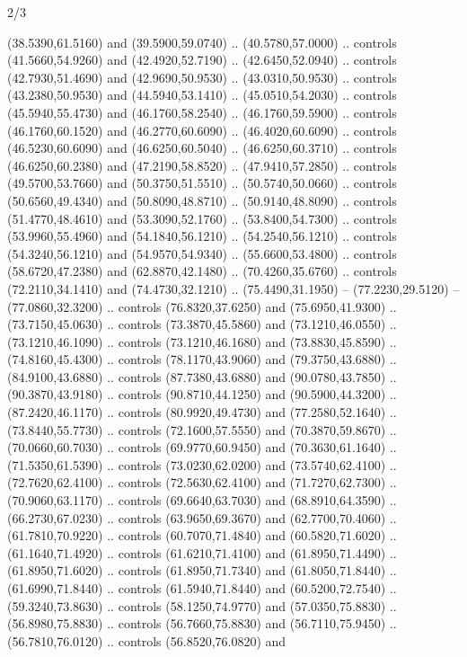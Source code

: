 \begin{flagdescription}{2/3}
\begin{scope}[xshift=0.5\flaglength,yshift=0.5\flagwidth,scale=\stretchfactor]
\begin{scope}[scale=0.001645\flagwidth,yshift=65mm,xshift=-63mm]
\begin{scope}[y=0.80pt, x=0.80pt, yscale=-1,]
\begin{scope}[cm={{1.33333,0.0,0.0,1.33333,(0.0,1e-05)}}]
  (38.5390,61.5160) and (39.5900,59.0740) .. (40.5780,57.0000) .. controls
  (41.5660,54.9260) and (42.4920,52.7190) .. (42.6450,52.0940) .. controls
  (42.7930,51.4690) and (42.9690,50.9530) .. (43.0310,50.9530) .. controls
  (43.2380,50.9530) and (44.5940,53.1410) .. (45.0510,54.2030) .. controls
  (45.5940,55.4730) and (46.1760,58.2540) .. (46.1760,59.5900) .. controls
  (46.1760,60.1520) and (46.2770,60.6090) .. (46.4020,60.6090) .. controls
  (46.5230,60.6090) and (46.6250,60.5040) .. (46.6250,60.3710) .. controls
  (46.6250,60.2380) and (47.2190,58.8520) .. (47.9410,57.2850) .. controls
  (49.5700,53.7660) and (50.3750,51.5510) .. (50.5740,50.0660) .. controls
  (50.6560,49.4340) and (50.8090,48.8710) .. (50.9140,48.8090) .. controls
  (51.4770,48.4610) and (53.3090,52.1760) .. (53.8400,54.7300) .. controls
  (53.9960,55.4960) and (54.1840,56.1210) .. (54.2540,56.1210) .. controls
  (54.3240,56.1210) and (54.9570,54.9340) .. (55.6600,53.4800) .. controls
  (58.6720,47.2380) and (62.8870,42.1480) .. (70.4260,35.6760) .. controls
  (72.2110,34.1410) and (74.4730,32.1210) .. (75.4490,31.1950) --
  (77.2230,29.5120) -- (77.0860,32.3200) .. controls (76.8320,37.6250) and
  (75.6950,41.9300) .. (73.7150,45.0630) .. controls (73.3870,45.5860) and
  (73.1210,46.0550) .. (73.1210,46.1090) .. controls (73.1210,46.1680) and
  (73.8830,45.8590) .. (74.8160,45.4300) .. controls (78.1170,43.9060) and
  (79.3750,43.6880) .. (84.9100,43.6880) .. controls (87.7380,43.6880) and
  (90.0780,43.7850) .. (90.3870,43.9180) .. controls (90.8710,44.1250) and
  (90.5900,44.3200) .. (87.2420,46.1170) .. controls (80.9920,49.4730) and
  (77.2580,52.1640) .. (73.8440,55.7730) .. controls (72.1600,57.5550) and
  (70.3870,59.8670) .. (70.0660,60.7030) .. controls (69.9770,60.9450) and
  (70.3630,61.1640) .. (71.5350,61.5390) .. controls (73.0230,62.0200) and
  (73.5740,62.4100) .. (72.7620,62.4100) .. controls (72.5630,62.4100) and
  (71.7270,62.7300) .. (70.9060,63.1170) .. controls (69.6640,63.7030) and
  (68.8910,64.3590) .. (66.2730,67.0230) .. controls (63.9650,69.3670) and
  (62.7700,70.4060) .. (61.7810,70.9220) .. controls (60.7070,71.4840) and
  (60.5820,71.6020) .. (61.1640,71.4920) .. controls (61.6210,71.4100) and
  (61.8950,71.4490) .. (61.8950,71.6020) .. controls (61.8950,71.7340) and
  (61.8050,71.8440) .. (61.6990,71.8440) .. controls (61.5940,71.8440) and
  (60.5200,72.7540) .. (59.3240,73.8630) .. controls (58.1250,74.9770) and
  (57.0350,75.8830) .. (56.8980,75.8830) .. controls (56.7660,75.8830) and
  (56.7110,75.9450) .. (56.7810,76.0120) .. controls (56.8520,76.0820) and

\end{scope}
\end{scope}
\end{scope}
\end{scope}
\end{flagdescription}
